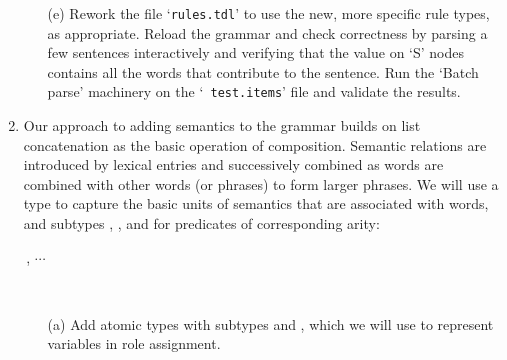 \documentclass[10pt]{article}
\begin{document}
\begin{enumerate}
\begin{itemize}
          \item [(e)]
                Rework the file `{\tt rules.tdl}' to use the new, more
                specific rule types, as appropriate.
                Reload the grammar and check correctness by parsing a
                few sentences interactively and verifying that the
                 value on `S' nodes contains all the words
                that contribute to the sentence.
                Run the `Batch parse' machinery on the `{\tt
                test.items}' file and validate the results.
        \end{itemize}
  \item Our approach to adding semantics to the grammar builds on list
        concatenation as the basic operation of composition.  Semantic
        relations are introduced by lexical entries and successively
        combined as words are combined with other words (or phrases) to
        form larger phrases.
        We will use a type  to capture the basic
        units of semantics that are associated with words, and subtypes
        , , and
         for predicates of corresponding arity:\\
        \centerline{
        $\,$,
        \hspace{2ex}
        $\cdots$%
        \hspace{2ex}}\\
        \begin{itemize}
          \item [(a)]
                Add atomic types  with subtypes
                 and , which we will use to
                represent variables in role assignment.

\end{itemize}
\end{enumerate}
\end{document}
